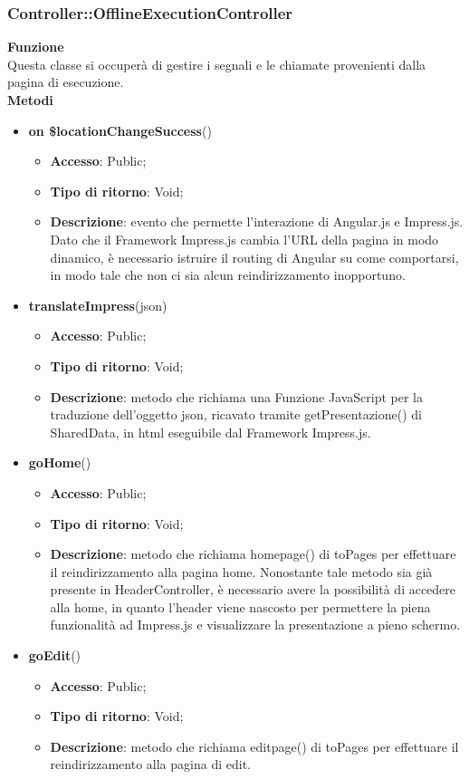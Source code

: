{	\subsubsection{Controller::\-OfflineExecutionController}{
				\textbf{Funzione}\\
				\indent Questa classe si occuperà di gestire i segnali e le chiamate provenienti dalla pagina di esecuzione.\\
				\textbf{Metodi}
				\begin{itemize}
					\item \textbf{on \$locationChangeSuccess}()
					\begin{itemize}
						\item \textbf{Accesso}: Public;
						\item \textbf{Tipo di ritorno}: Void;
						\item \textbf{Descrizione}: evento che permette l'interazione di Angular.js e Impress.js. Dato che il Framework\ped{g} Impress.js cambia l'URL della pagina in modo dinamico, è necessario istruire il routing di Angular su come comportarsi, in modo tale che non ci sia alcun reindirizzamento inopportuno.
					\end{itemize}
					\item \textbf{translateImpress}(json)
					\begin{itemize}
						\item \textbf{Accesso}: Public;
						\item \textbf{Tipo di ritorno}: Void;
						\item \textbf{Descrizione}: metodo che richiama una Funzione\ped{g} JavaScript per la traduzione dell'oggetto json, ricavato tramite getPresentazione() di SharedData, in html eseguibile dal Framework Impress.js.
					\end{itemize}
					\item \textbf{goHome}()
					\begin{itemize}
						\item \textbf{Accesso}: Public;
						\item \textbf{Tipo di ritorno}: Void;
						\item \textbf{Descrizione}: metodo che richiama homepage() di toPages per effettuare il reindirizzamento alla pagina home. Nonostante tale metodo sia già presente in HeaderController, è necessario avere la possibilità di accedere alla home, in quanto l'header viene nascosto per permettere la piena funzionalità ad Impress.js e visualizzare la presentazione a pieno schermo.
					\end{itemize}
					\item \textbf{goEdit}()
					\begin{itemize}
						\item \textbf{Accesso}: Public;
						\item \textbf{Tipo di ritorno}: Void;
						\item \textbf{Descrizione}: metodo che richiama editpage() di toPages per effettuare il reindirizzamento alla pagina di edit.
					\end{itemize}
				\end{itemize}
			}
	
}

